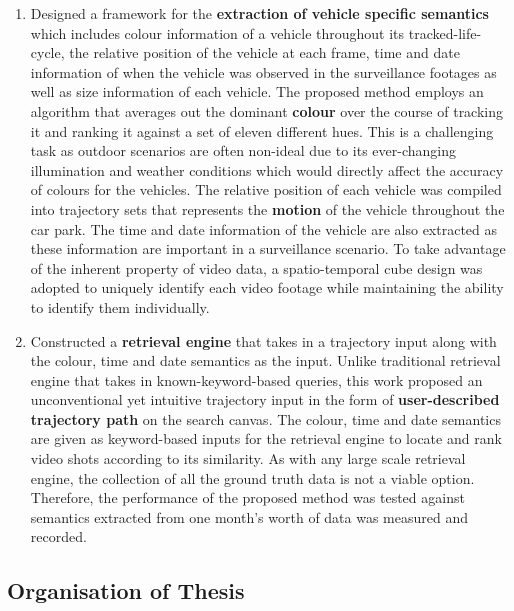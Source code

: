 \begin{enumerate}  
\item Designed a framework for the \textbf{extraction of vehicle specific semantics} which includes colour information of a vehicle throughout its tracked-life-cycle, the relative position of the vehicle at each frame, time and date information of when the vehicle was observed in the surveillance footages as well as size information of each vehicle. The proposed method employs an algorithm that averages out the dominant \textbf{colour} over the course of tracking it and ranking it against a set of eleven different hues. This is a challenging task as outdoor scenarios are often non-ideal due to its ever-changing illumination and weather conditions which would directly affect the accuracy of colours for the vehicles. The relative position of each vehicle was compiled into trajectory sets that represents the \textbf{motion} of the vehicle throughout the car park. The time and date information of the vehicle are also extracted as these information are important in a surveillance scenario. To take advantage of the inherent property of video data, a spatio-temporal cube design was adopted to uniquely identify each video footage while maintaining the ability to identify them individually.  
\item Constructed a \textbf{retrieval engine} that takes in a trajectory input along with the colour, time and date semantics as the input. Unlike traditional retrieval engine that takes in known-keyword-based queries, this work proposed an unconventional yet intuitive trajectory input in the form of \textbf{user-described trajectory path} on the search canvas. The colour, time and date semantics are given as keyword-based inputs for the retrieval engine to locate and rank video shots according to its similarity. As with any large scale retrieval engine, the collection of all the ground truth data is not a viable option. Therefore, the performance of the proposed method was tested against semantics extracted from one month's worth of data was measured and recorded. 
\end{enumerate}



\subsection{Organisation of Thesis}


